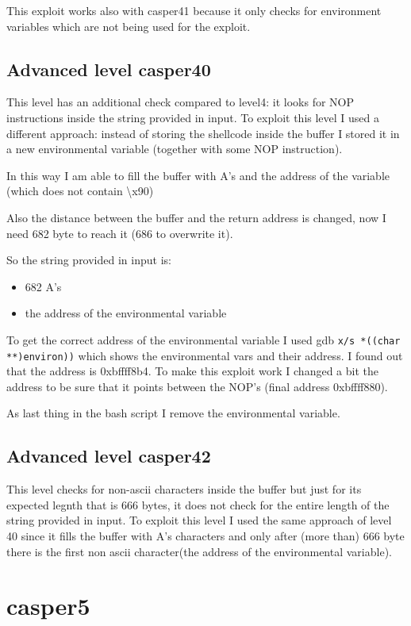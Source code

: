 \documentclass[a4paper,12pt]{article}
\begin{document}
This exploit works also with casper41 because it only checks for environment variables which are not being used for the exploit. 

\subsection{Advanced level casper40}

This level has an additional check compared to level4: it looks for NOP instructions inside the string provided in input. To exploit this level I used a different approach: instead of storing the shellcode inside the buffer I stored it in a new environmental variable (together with some NOP instruction).  

In this way I am able to fill the buffer with A's and the address of the variable (which does not contain \textbackslash x90)

Also the distance between the buffer and the return address is changed, now I need 682 byte to reach it (686 to overwrite it).

So the string provided in input is:
\begin{itemize}
\item 682 A's
\item the address of the environmental variable
\end{itemize}

To get the correct address of the environmental variable I used gdb \texttt{x/s *((char **)environ))} which shows the environmental vars and their address. I found out that the address is 0xbffff8b4. To make this exploit work I changed a bit the address to be sure that it points between the NOP's (final address 0xbffff880).

As last thing in the bash script I remove the environmental variable.

\subsection{Advanced level casper42}

This level checks for non-ascii characters inside the buffer but just for its expected legnth that is 666 bytes, it does not check for the entire length of the string provided in input. To exploit this level I used the same approach of level 40 since it fills the buffer with A's characters and only after (more than) 666 byte there is the first non ascii character(the address of the environmental variable).

\section{casper5}
\end{document}
